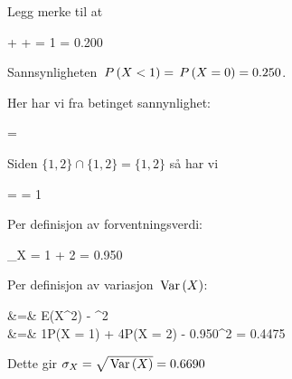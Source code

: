 \oppgave
Legg merke til at
\begin{utregning}
	 +  +  = 1 \quad \implies \quad {} = 0.200
\end{utregning}
\deloppgave
Sannsynligheten $\,P\left(X < 1\right) = \,P\left(X = 0\right) = 0.250$.

\deloppgave
Her har vi fra betinget sannynlighet:
\begin{likning}
	 = 
\end{likning}
Siden $\{1, 2\} \cap \{1, 2\} = \{1, 2\}$ så har vi
\begin{likning}
	 =  = 1
\end{likning}

\deloppgave
Per definisjon av forventningsverdi:
\begin{likning}
	\mu_X = 1\cdot {} + 2 = 0.950
\end{likning}

\deloppgave
Per definisjon av variasjon $\, \mathrm{Var}\left(X\right)$:
\begin{utregning}
	 &=& E\left(X^2\right) - ^2\\
	&=& 1\cdot P(X = 1) + 4\cdot P(X = 2) - 0.950^2 = 0.4475
\end{utregning}
Dette gir $\sigma_X = \sqrt{\, \mathrm{Var}\left(X\right)} = 0.6690$

